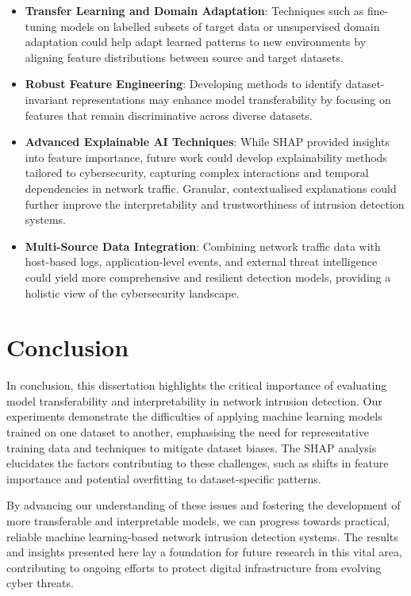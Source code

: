 \begin{itemize}
    \item \textbf{Transfer Learning and Domain Adaptation}: Techniques such as fine-tuning models on labelled subsets of target data or unsupervised domain adaptation could help adapt learned patterns to new environments by aligning feature distributions between source and target datasets.
    \item \textbf{Robust Feature Engineering}: Developing methods to identify dataset-invariant representations may enhance model transferability by focusing on features that remain discriminative across diverse datasets.
    \item \textbf{Advanced Explainable AI Techniques}: While SHAP provided insights into feature importance, future work could develop explainability methods tailored to cybersecurity, capturing complex interactions and temporal dependencies in network traffic. Granular, contextualised explanations could further improve the interpretability and trustworthiness of intrusion detection systems.
    \item \textbf{Multi-Source Data Integration}: Combining network traffic data with host-based logs, application-level events, and external threat intelligence could yield more comprehensive and resilient detection models, providing a holistic view of the cybersecurity landscape.
\end{itemize}

\section{Conclusion}

In conclusion, this dissertation highlights the critical importance of evaluating model transferability and interpretability in network intrusion detection. Our experiments demonstrate the difficulties of applying machine learning models trained on one dataset to another, emphasising the need for representative training data and techniques to mitigate dataset biases. The SHAP analysis elucidates the factors contributing to these challenges, such as shifts in feature importance and potential overfitting to dataset-specific patterns.

By advancing our understanding of these issues and fostering the development of more transferable and interpretable models, we can progress towards practical, reliable machine learning-based network intrusion detection systems. The results and insights presented here lay a foundation for future research in this vital area, contributing to ongoing efforts to protect digital infrastructure from evolving cyber threats.